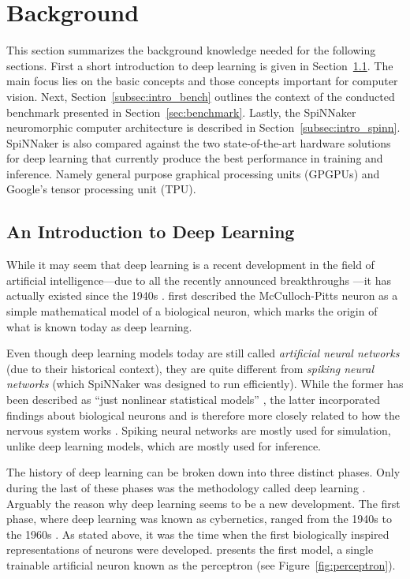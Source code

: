\documentclass[]{article}
\begin{document}


\section{Background} %
\label{sec:background}

This section summarizes the background knowledge needed for the
following sections.
First a short introduction to deep learning is given in
Section~\ref{subsec:intro_dl}.
The main focus lies on the basic concepts and those concepts important
for computer vision.
Next, Section~\ref{subsec:intro_bench} outlines the context of the
conducted benchmark presented in Section~\ref{sec:benchmark}.
Lastly, the SpiNNaker neuromorphic computer architecture is described
in Section~\ref{subsec:intro_spinn}.
SpiNNaker is also compared against the two state-of-the-art hardware
solutions for deep learning that currently produce the best
performance in training and inference.
Namely general purpose graphical processing units (GPGPUs) and
Google's tensor processing unit (TPU).

\subsection{An Introduction to Deep Learning} %
\label{subsec:intro_dl}

While it may seem that deep learning is a recent development in the
field of artificial intelligence---due to all the recently announced
breakthroughs \citep{senior_et_al_2020, vinyals_et_al_2019,
  openai_2019, margi_2019}---it has actually existed since the 1940s
\citep{goodfellow_et_al_2016}.
\citet{mcculloch_et_al_1943} first described the McCulloch-Pitts
neuron as a simple mathematical model of a biological neuron, which
marks the origin of what is known today as deep learning.

Even though deep learning models today are still called
\textit{artificial neural networks} (due to their historical context),
they are quite different from \textit{spiking neural networks}
(which SpiNNaker was designed to run efficiently).
While the former has been described as ``just nonlinear statistical
models'' \citep{hastie_et_al_2009}, the latter incorporated findings
about biological neurons and is therefore more closely related to how
the nervous system works \citep{maass1997}.
Spiking neural networks are mostly used for simulation, unlike deep
learning models, which are mostly used for inference.

The history of deep learning can be broken down into three distinct
phases.
Only during the last of these phases was the methodology
called deep learning \citep{goodfellow_et_al_2016}.
Arguably the reason why deep learning seems to be a new development.
The first phase, where deep learning was known as cybernetics, ranged
from the 1940s to the 1960s \citep{goodfellow_et_al_2016}.
As stated above, it was the time when the first biologically
inspired representations of neurons were developed.
\citet{rosenblatt_1958} presents the first model, a single trainable
artificial neuron known as the perceptron (see
Figure~\ref{fig:perceptron}).
\end{document}
